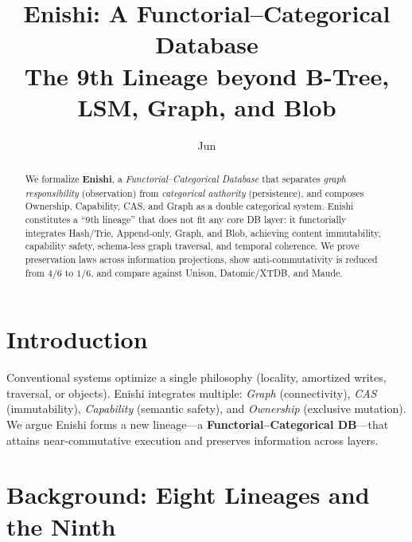 \documentclass[10pt]{article}
\title{Enishi: A Functorial--Categorical Database\\
\large The 9th Lineage beyond B-Tree, LSM, Graph, and Blob}
\author{Jun}
\date{}
\begin{document}
\maketitle

\begin{abstract}
We formalize \textbf{Enishi}, a \emph{Functorial--Categorical Database} that separates
\emph{graph responsibility} (observation) from \emph{categorical authority} (persistence),
and composes Ownership, Capability, CAS, and Graph as a double categorical system.
Enishi constitutes a ``9th lineage'' that does not fit any core DB layer: it
functorially integrates Hash/Trie, Append-only, Graph, and Blob, achieving content immutability,
capability safety, schema-less graph traversal, and temporal coherence.
We prove preservation laws across information projections, show anti-commutativity is reduced
from $4/6$ to $1/6$, and compare against Unison, Datomic/XTDB, and Maude.
\end{abstract}

\section{Introduction}
Conventional systems optimize a single philosophy (locality, amortized writes, traversal, or objects).
Enishi integrates multiple: \emph{Graph} (connectivity), \emph{CAS} (immutability), \emph{Capability} (semantic safety),
and \emph{Ownership} (exclusive mutation).
We argue Enishi forms a new lineage---a \textbf{Functorial--Categorical DB}---that attains near-commutative execution
and preserves information across layers.

\section{Background: Eight Lineages and the Ninth}
\end{document}
